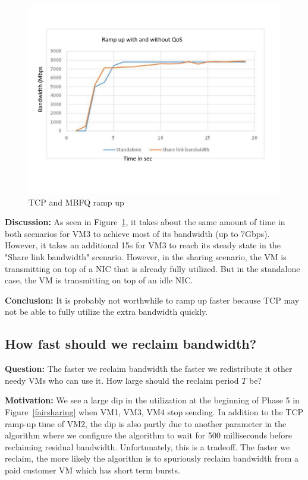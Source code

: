 \begin{figure}[h]
\centering
\includegraphics[width=0.7\columnwidth,trim=60pt 40mm 0pt 8mm]{figures/rampupcomparison}
\caption{TCP and MBFQ ramp up}
\label{rampupcomparison}
\vspace{-3mm}
\end{figure}

{\bf Discussion:} As seen in Figure~\ref{rampupcomparison}, it takes about the
same amount of time in both scenarios for VM3 to achieve most of its bandwidth
(up to 7Gbps). However, it takes an additional 15s for VM3 to reach its steady
state  in the "Share link bandwidth" scenario. However, in the sharing scenario,
the VM is transmitting on top of a NIC that is already fully utilized.
But in the standalone case, the VM is transmitting on top of an idle NIC. 

{\bf Conclusion:} It is probably not worthwhile 
to ramp up faster because TCP may not be able to fully utilize the extra
bandwidth quickly.

\subsection{How fast should we reclaim bandwidth?}
\label{reclaimbw}
{\bf Question:}  The faster we reclaim bandwidth the
faster we redistribute it other needy VMs who can use it. How large should the
reclaim period $T$ be?

{\bf Motivation:} 
We see a large dip in the utilization at the beginning of Phase 5 in
Figure~\ref{fairsharing} when VM1, VM3, VM4 stop sending.  In addition to the
TCP ramp-up time of VM2, the dip is also partly due to another parameter in the
algorithm where we configure the algorithm to wait for 500 milliseconds before
reclaiming residual bandwidth.  Unfortunately, this is a tradeoff.  The faster we
reclaim, the more likely the algorithm is to spuriously reclaim bandwidth from a
paid customer VM which has short term bursts.

